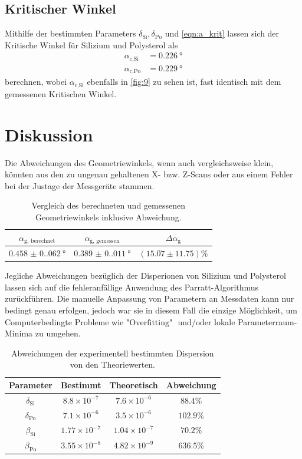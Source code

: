 \documentclass[12pt]{article}
\begin{document}
\subsection{Kritischer Winkel}
Mithilfe der bestimmten Parameters $\delta_\text{Si},\delta_\text{Po}$ und \autoref{eqn:a_krit} lassen sich der Kritische Winkel für Silizium und Polysterol als
\begin{align*}
  \alpha_\text{c,Si}&=\SI{0.226}{\degree}\\
  \alpha_\text{c,Po}&=\SI{0.229}{\degree}
\end{align*}
berechnen, wobei $\alpha_\text{c,Si}$ ebenfalls in \autoref{fig:9} zu sehen ist, fast identisch mit dem gemessenen Kritischen Winkel.
\section{Diskussion}\label{sec:diskussion}
Die Abweichungen des Geometriewinkels, wenn auch vergleichsweise klein, könnten aus den zu ungenau gehaltenen X- bzw. Z-Scans oder aus einem Fehler bei der Justage der Messgeräte stammen.
\begin{table}[H]
  \centering
  \renewcommand{\arraystretch}{1.5} %
  \caption{Vergleich des berechneten und gemessenen Geometriewinkels inklusive Abweichung.}
  \begin{tabular}{c|c|c}
    \hline
    $\alpha_\text{g, berechnet}$ & $\alpha_\text{g, gemessen}$ & $\Delta\alpha_\text{g}$ \\
    \hline
    $\SI{0.458(0.062)}{\degree}$ & $\SI{0.389(0.011)}{\degree}$ &  $(\num{15.07} \pm \num{11.75})\%$ \\
  \end{tabular}
  \label{tab:geometriewinkel}
\end{table}
Jegliche Abweichungen bezüglich der Disperionen von Silizium und Polysterol lassen sich auf die fehleranfällige Anwendung des Parratt-Algorithmus zurückführen.
Die manuelle Anpassung von Parametern an Messdaten kann nur bedingt genau erfolgen, jedoch war sie in diesem Fall die einzige Möglichkeit, um Computerbedingte Probleme wie "$\text{Overfitting}$" $\text{ und/oder}$ lokale Parameterraum-Minima zu umgehen.
\begin{table}[H]
  \centering
  \renewcommand{\arraystretch}{1.5}
  \begin{tabular}{c|c|c|c}
    \hline
    Parameter & Bestimmt & Theoretisch & Abweichung \\
    \hline
    $\delta_\text{Si}$ &  $\num{8.8} \times 10^{-7}$ &    $\num{7.6}\times 10^{-6}$  &     $\num{88.4}\%$ \\
    $\delta_\text{Po}$ &  $\num{7.1} \times 10^{-6}$ &    $\num{3.5}\times 10^{-6}$  &     $\num{102.9}\%$ \\
    $\beta_\text{Si}$ &   $\num{1.77}  \times 10^{-7}$ &  $\num{1.04}\times 10^{-7}$ &   $\num{70.2}\%$ \\
    $\beta_\text{Po}$ &   $\num{3.55}  \times 10^{-8}$ &  $\num{4.82}\times 10^{-9}$ &   $\num{636.5}\%$ \\
    \hline
  \end{tabular}
  \caption{Abweichungen der experimentell bestimmten Dispersion von den Theoriewerten.}
  \label{tab:parameter}
\end{table}
\end{document}
